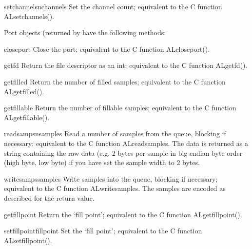 \begin{funcdesc}{setchannels}{nchannels}
Set the channel count; equivalent to the C function ALsetchannels().
\end{funcdesc}

Port objects (returned by  have the following
methods:

\renewcommand{\indexsubitem}{(audio port object method)}
\begin{funcdesc}{closeport}{}
Close the port; equivalent to the C function ALcloseport().
\end{funcdesc}

\begin{funcdesc}{getfd}{}
Return the file descriptor as an int; equivalent to the C function
ALgetfd().
\end{funcdesc}

\begin{funcdesc}{getfilled}{}
Return the number of filled samples; equivalent to the C function
ALgetfilled().
\end{funcdesc}

\begin{funcdesc}{getfillable}{}
Return the number of fillable samples; equivalent to the C function
ALgetfillable().
\end{funcdesc}

\begin{funcdesc}{readsamps}{nsamples}
Read a number of samples from the queue, blocking if necessary;
equivalent to the C function ALreadsamples.  The data is returned as a
string containing the raw data (e.g. 2 bytes per sample in big-endian
byte order (high byte, low byte) if you have set the sample width to 2
bytes.
\end{funcdesc}

\begin{funcdesc}{writesamps}{samples}
Write samples into the queue, blocking if necessary; equivalent to the
C function ALwritesamples.  The samples are encoded as described for
the  return value.
\end{funcdesc}

\begin{funcdesc}{getfillpoint}{}
Return the `fill point'; equivalent to the C function ALgetfillpoint().
\end{funcdesc}

\begin{funcdesc}{setfillpoint}{fillpoint}
Set the `fill point'; equivalent to the C function ALsetfillpoint().
\end{funcdesc}

